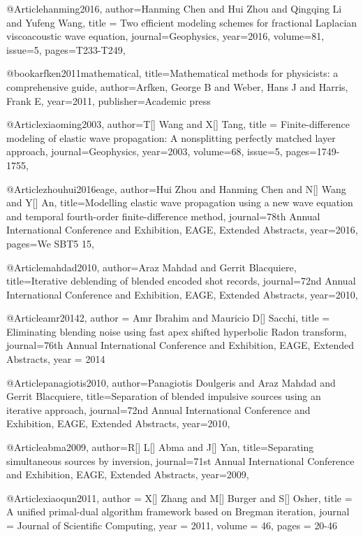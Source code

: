 @Article{hanming2016,
  author={Hanming Chen and Hui Zhou and Qingqing Li and Yufeng Wang},
  title = {Two efficient modeling schemes for fractional Laplacian viscoacoustic wave equation},
  journal={Geophysics},
  year=2016,
  volume=81,
  issue=5,
  pages={T233-T249},
}

@book{arfken2011mathematical,
  title={Mathematical methods for physicists: a comprehensive guide},
  author={Arfken, George B and Weber, Hans J and Harris, Frank E},
  year={2011},
  publisher={Academic press}
}

@Article{xiaoming2003,
  author={T[] Wang and X[] Tang},
  title = {Finite-difference modeling of elastic wave propagation: A nonsplitting perfectly matched layer approach},
  journal={Geophysics},
  year=2003,
  volume=68,
  issue=5,
  pages={1749-1755},
}

	




@Article{zhouhui2016eage,
  author={Hui Zhou and Hanming Chen and N[] Wang and Y[] An},
  title={Modelling elastic wave propagation using a new wave equation and temporal fourth-order finite-difference  method},
  journal={78th Annual International Conference and Exhibition, EAGE, Extended Abstracts},
  year=2016,
  pages={We SBT5 15},
}



@Article{mahdad2010,
  author={Araz Mahdad and Gerrit Blacquiere},
  title={Iterative deblending of blended encoded shot records},
  journal={72nd Annual International Conference and Exhibition, EAGE, Extended Abstracts},
  year=2010,
}

@Article{amr20142,
  author = 	 {Amr Ibrahim and Mauricio D[] Sacchi},
  title = 	 {Eliminating blending noise using fast apex shifted hyperbolic Radon transform},
  journal={76th Annual International Conference and Exhibition, EAGE, Extended Abstracts},
  year = 	 2014} 
  
@Article{panagiotis2010,
  author={Panagiotis Doulgeris and Araz Mahdad and Gerrit Blacquiere},
  title={Separation of blended impulsive sources using an iterative approach},
  journal={72nd Annual International Conference and Exhibition, EAGE, Extended Abstracts},
  year=2010,
}

@Article{abma2009,
  author={R[] L[] Abma and J[] Yan},
  title={Separating simultaneous sources by inversion},
  journal={71st Annual International Conference and Exhibition, EAGE, Extended Abstracts},
  year=2009,
}

@Article{xiaoqun2011,
  author = 	 {X[] Zhang and M[] Burger and S[] Osher},
  title = 	 {A unified primal-dual algorithm framework based on Bregman iteration},
  journal = 	 {Journal of Scientific Computing},
  year = 	 2011,
  volume = 	 46,
  pages = 	 {20-46}}
  
